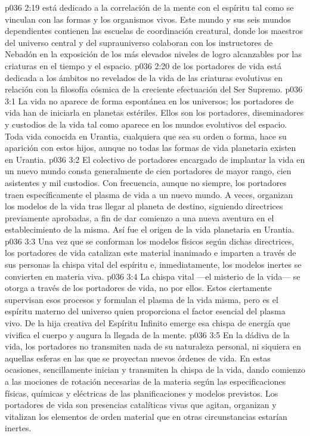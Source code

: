 \vs p036 2:19 \pc {} está dedicado a la correlación de la mente con el espíritu tal como se vinculan con las formas y los organismos vivos. Este mundo y sus seis mundos dependientes contienen las escuelas de coordinación creatural, donde los maestros del universo central y del suprauniverso colaboran con los instructores de Nebadón en la exposición de los más elevados niveles de logro alcanzables por las criaturas en el tiempo y el espacio.
\vs p036 2:20 \pc {} de los portadores de vida está dedicada a los ámbitos no revelados de la vida de las criaturas evolutivas en relación con la filosofía cósmica de la creciente efectuación del Ser Supremo.
\vs p036 3:1 La vida no aparece de forma espontánea en los universos; los portadores de vida han de iniciarla en planetas estériles. Ellos son los portadores, diseminadores y custodios de la vida tal como aparece en los mundos evolutivos del espacio. Toda vida conocida en Urantia, cualquiera que sea su orden o forma, hace su aparición con estos hijos, aunque no todas las formas de vida planetaria existen en Urantia.
\vs p036 3:2 El colectivo de portadores encargado de implantar la vida en un nuevo mundo consta generalmente de cien portadores de mayor rango, cien asistentes y mil custodios. Con frecuencia, aunque no siempre, los portadores traen específicamente el plasma de vida a un nuevo mundo. A veces, organizan los modelos de la vida tras llegar al planeta de destino, siguiendo directrices previamente aprobadas, a fin de dar comienzo a una nueva aventura en el establecimiento de la misma. Así fue el origen de la vida planetaria en Urantia.
\vs p036 3:3 Una vez que se conforman los modelos físicos según dichas directrices, los portadores de vida catalizan este material inanimado e imparten a través de sus personas la chispa vital del espíritu e, inmediatamente, los modelos inertes se convierten en materia viva.
\vs p036 3:4 \pc La chispa vital ---el misterio de la vida--- se otorga a través de los portadores de vida, no por ellos. Estos ciertamente supervisan esos procesos y formulan el plasma de la vida misma, pero es el espíritu materno del universo quien proporciona el factor esencial del plasma vivo. De la hija creativa del Espíritu Infinito emerge esa chispa de energía que vivifica el cuerpo y augura la llegada de la mente.
\vs p036 3:5 \pc En la dádiva de la vida, los portadores no transmiten nada de su naturaleza personal, ni siquiera en aquellas esferas en las que se proyectan nuevos órdenes de vida. En estas ocasiones, sencillamente inician y transmiten la chispa de la vida, dando comienzo a las mociones de rotación necesarias de la materia según las especificaciones físicas, químicas y eléctricas de las planificaciones y modelos previstos. Los portadores de vida son presencias catalíticas vivas que agitan, organizan y vitalizan los elementos de orden material que en otras circunstancias estarían inertes.
